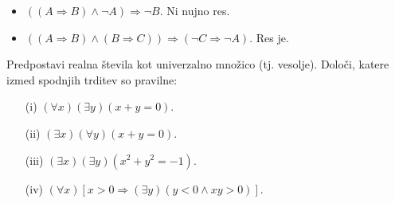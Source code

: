 \documentclass[11pt,paper=b5,footinclude,headinclude]{scrbook} %
\newtheorem{ex}{Vaja\hypertarget{sol:\theex}}[chapter]
\begin{document}
\begin{ex}
\begin{sol}
\begin{itemize}
\item $((A\Rightarrow B) \wedge \neg A) \Rightarrow \neg B$. Ni nujno res.
    \item $((A\Rightarrow B) \wedge (B\Rightarrow C)) \Rightarrow (\neg C \Rightarrow \neg A)$. Res je.
\end{itemize}


\end{sol}

\end{ex} \begin{ex} Predpostavi realna števila kot univerzalno množico (tj. vesolje). Določi, katere izmed spodnjih trditev so pravilne:
\begin{enumerate}
\item[(i)] $(\forall x)(\exists y)(x+y=0)$.
\item[(ii)] $(\exists x)(\forall y)(x+y=0)$.
\item[(iii)] $(\exists x)(\exists y)(x^2+y^2 =-1)$.
\item[(iv)] $(\forall x)[x>0 \Rightarrow (\exists y)(y<0 \wedge xy>0)]$.
\end{enumerate} 

\end{ex}



\end{document}
